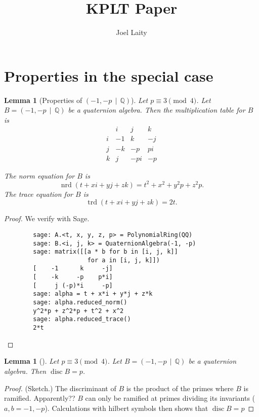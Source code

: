 \documentclass[10pt]{article}
\title{KPLT Paper}
\author{Joel Laity}
\theoremstyle{plain}
\newtheorem{lemma}[theorem]{Lemma}
\theoremstyle{definition}
\newcommand{\op}{\operatorname}
\newcommand{\Q}{\mathbb{Q}}
\newcommand{\nrd}{\op{nrd}}
\newcommand{\trd}{\op{trd}}
\newcommand{\disc}{\op{disc}}
\begin{document}
\maketitle
\tableofcontents

\section{Properties in the special case}

\begin{lemma}[Properties of \( (-1, -p \, \mid \, \Q) \)]
    Let \( p \equiv 3 \pmod{4} \).
    Let \( B =  (-1, -p \, \mid \, \Q) \) be a quaternion algebra.
    Then the multiplication table for \( B \) is
    \[
        \begin{array}{c|ccc}
              & i  & j   & k  \\
            \hline
            i & -1 & k   & -j \\
            j & -k & -p  & pi \\
            k & j  & -pi & -p
        \end{array}
    \]

    The norm equation for \( B \) is
    \[
        \nrd(t + xi + yj + zk) = t^2 + x^2 + y^2p + z^2p.
    \]
    The trace equation for \( B \) is
    \[
        \trd(t + xi + yj + zk) = 2t.
    \]
\end{lemma}
\begin{proof}
    We verify with Sage.
    \begin{lstlisting}
        sage: A.<t, x, y, z, p> = PolynomialRing(QQ)
        sage: B.<i, j, k> = QuaternionAlgebra(-1, -p)
        sage: matrix([[a * b for b in [i, j, k]]
                       for a in [i, j, k]])
        [    -1      k     -j]
        [    -k     -p    p*i]
        [     j (-p)*i     -p]
        sage: alpha = t + x*i + y*j + z*k
        sage: alpha.reduced_norm()
        y^2*p + z^2*p + t^2 + x^2
        sage: alpha.reduced_trace()
        2*t
    \end{lstlisting}
\end{proof}

\begin{lemma}[]
    Let \( p \equiv 3 \pmod{4} \).
    Let \( B =  (-1, -p \, \mid \, \Q) \) be a quaternion algebra.
    Then \( \disc B = p \).
\end{lemma}
\begin{proof}
    (Sketch.)
    The discriminant of \( B \) is the product of the primes where \( B \) is ramified.
    Apparently?? \( B \) can only be ramified at primes dividing its invariants (\( a, b = -1, -p\)).
    Calculations with hilbert symbols then shows that \( \disc B = p \)
\end{proof}
\end{document}
